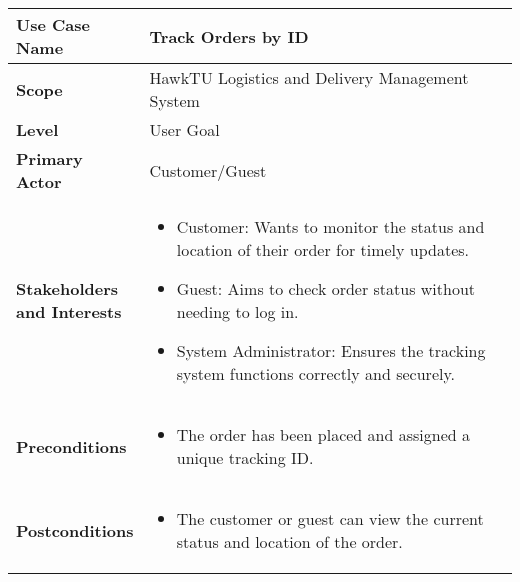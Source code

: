 \documentclass{article}
\begin{document}
\begin{longtable}{|>{\raggedright\arraybackslash}m{0.25\linewidth}|m{0.75\linewidth}|}
\hline
\textbf{Use Case Name} & Track Orders by ID \\
\hline
\textbf{Scope} & HawkTU Logistics and Delivery Management System \\
\hline
\textbf{Level} & User Goal \\
\hline
\textbf{Primary Actor} & Customer/Guest \\ 
\hline
\textbf{Stakeholders and Interests} & 
\begin{itemize}
    \item Customer: Wants to monitor the status and location of their order for timely updates.
    \item Guest: Aims to check order status without needing to log in.
    \item System Administrator: Ensures the tracking system functions correctly and securely.
\end{itemize} \\
\hline
\textbf{Preconditions} & 
\begin{itemize}
    \item The order has been placed and assigned a unique tracking ID.
\end{itemize} \\
\hline
\textbf{Postconditions} & 
\begin{itemize}
    \item The customer or guest can view the current status and location of the order.
\end{itemize} \\
\hline
\end{longtable}

\vspace{-2.45em}
\end{document}
